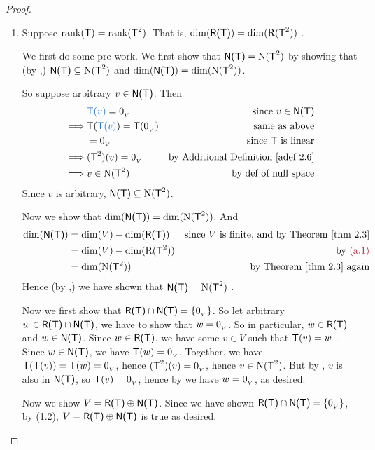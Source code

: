 \begin{proof} \ 

\begin{enumerate}
\item Suppose \(\mathrm{rank}(\textsf{T}) = \mathrm{rank}(\textsf{T}^2)\).
That is, \(\dim(\textsf{R(T)}) = \dim(\mathrm{R}(\textsf{T}^2))\) .

We first do some pre-work.
We first show that \(\textsf{N(T)} = \mathrm{N}(\textsf{T}^2)\) by showing that (by ,) \(\textsf{N(T)} \subseteq \mathrm{N}(\textsf{T}^2)\) and \(\dim(\textsf{N(T)}) = \dim(\mathrm{N}(\textsf{T}^2))\).

So suppose arbitrary \(v \in \textsf{N(T)}\).
Then
\begin{align*}
             & \BLUE{\T(v)} = \OV & \text{since \(v \in \NULLT\)} \\
    \implies & \T(\BLUE{\T(v)}) = \T(\OV) & \text{same as above} \\
             & = \OV & \text{since \(\T\) is linear} \\
    \implies & (\T^2)(v) = \OV & \text{by \ADEF{2.6}} \\
    \implies & v \in \NULL(\T^2) & \text{by def of null space}
\end{align*}
Since \(v\) is arbitrary, \(\textsf{N(T)} \subseteq \mathrm{N}(\textsf{T}^2)\).

Now we show that \(\dim(\textsf{N(T)}) = \dim(\mathrm{N}(\textsf{T}^2))\).
And
\begin{align*}
    \dim(\NULLT) & = \dim(V) - \dim(\RANGET) & \text{since \(V\) is finite, and by \THM{2.3}} \\
                 & = \dim(V) - \dim(\RANGE(\T^2)) & \text{by \MAROON{(a.1)}} \\
                 & = \dim(\NULL(\T^2)) & \text{by \THM{2.3} again}
\end{align*}
Hence (by ,) we have shown that \(\textsf{N(T)} = \mathrm{N}(\textsf{T}^2)\) .

Now we first show that \(\textsf{R(T)} \cap \textsf{N(T)} = \{ 0_{_V} \}\).
So let arbitrary \(w \in \textsf{R(T)} \cap \textsf{N(T)}\), we have to show that \(w = 0_{_V}\).
So in particular, \(w \in \textsf{R(T)}\) and \(w \in \textsf{N(T)}\).
Since \(w \in \textsf{R(T)}\), we have some \(v \in V\) such that \(\textsf{T}(v) = w\) .
Since \(w \in \textsf{N(T)}\), we have \(\textsf{T}(w) = 0_{_V}\).
Together, we have \(\textsf{T}(\textsf{T}(v)) = \textsf{T}(w) = 0_{_V}\), hence \((\textsf{T}^2)(v) = 0_{_V}\), hence \(v \in \mathrm{N}(\textsf{T}^2)\).
But by , \(v\) is also in \(\textsf{N(T)}\), so \(\textsf{T}(v) = 0_{_V}\), hence by  we have \(w = 0_{_V}\), as desired.

Now we show \(V = \textsf{R(T)} \oplus \textsf{N(T)}\).
Since we have shown \(\textsf{R(T)} \cap \textsf{N(T)} = \{ 0_{_V} \}\), by (1.2), \(V = \textsf{R(T)} \oplus \textsf{N(T)}\) is true as desired.


\end{enumerate}
\end{proof}
